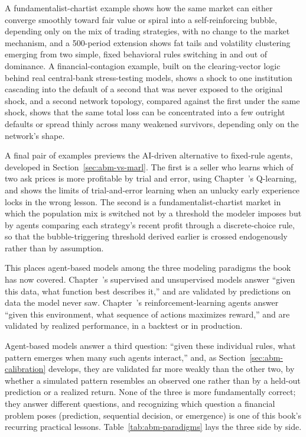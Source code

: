 \documentclass[../ai_in_finance]{subfiles}
\begin{document}
A fundamentalist-chartist example shows how the same market can either converge smoothly toward fair value or spiral into a self-reinforcing bubble, depending only on the mix of trading strategies, with no change to the market mechanism, and a 500-period extension shows fat tails and volatility clustering emerging from two simple, fixed behavioral rules switching in and out of dominance. A financial-contagion example, built on the clearing-vector logic behind real central-bank stress-testing models, shows a shock to one institution cascading into the default of a second that was never exposed to the original shock, and a second network topology, compared against the first under the same shock, shows that the same total loss can be concentrated into a few outright defaults or spread thinly across many weakened survivors, depending only on the network's shape.

A final pair of examples previews the AI-driven alternative to fixed-rule agents, developed in Section~\ref{sec:abm-vs-marl}. The first is a seller who learns which of two ask prices is more profitable by trial and error, using Chapter~'s Q-learning, and shows the limits of trial-and-error learning when an unlucky early experience locks in the wrong lesson. The second is a fundamentalist-chartist market in which the population mix is switched not by a threshold the modeler imposes but by agents comparing each strategy's recent profit through a discrete-choice rule, so that the bubble-triggering threshold derived earlier is crossed endogenously rather than by assumption.

This places agent-based models among the three modeling paradigms the book has now covered. Chapter~'s supervised and unsupervised models answer ``given this data, what function best describes it,'' and are validated by predictions on data the model never saw. Chapter~'s reinforcement-learning agents answer ``given this environment, what sequence of actions maximizes reward,'' and are validated by realized performance, in a backtest or in production.

Agent-based models answer a third question: ``given these individual rules, what pattern emerges when many such agents interact,'' and, as Section~\ref{sec:abm-calibration} develops, they are validated far more weakly than the other two, by whether a simulated pattern resembles an observed one rather than by a held-out prediction or a realized return. None of the three is more fundamentally correct; they answer different questions, and recognizing which question a financial problem poses (prediction, sequential decision, or emergence) is one of this book's recurring practical lessons. Table~\ref{tab:abm-paradigms} lays the three side by side.
\end{document}
